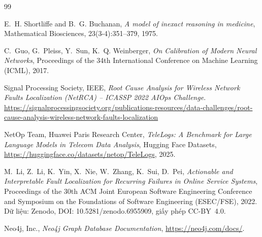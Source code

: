 \documentclass[12pt,a4paper]{report}
\begin{document}
\begin{thebibliography}{99}

E.~H. Shortliffe and B.~G. Buchanan,
\emph{A model of inexact reasoning in medicine},
Mathematical Biosciences, 23(3-4):351--379, 1975.

C.~Guo, G.~Pleiss, Y.~Sun, K.~Q. Weinberger,
\emph{On Calibration of Modern Neural Networks},
Proceedings of the 34th International Conference on Machine Learning (ICML), 2017.

Signal Processing Society, IEEE,
\emph{Root Cause Analysis for Wireless Network Faults Localization (NetRCA) -- ICASSP 2022 AIOps
Challenge}.
\url{https://signalprocessingsociety.org/publications-resources/data-challenges/root-cause-analysis-wireless-network-faults-localization}

NetOp Team, Huawei Paris Research Center,
\emph{TeleLogs: A Benchmark for Large Language Models in Telecom Data Analysis},
Hugging Face Datasets, \url{https://huggingface.co/datasets/netop/TeleLogs}, 2025.

M.~Li, Z.~Li, K.~Yin, X.~Nie, W.~Zhang, K.~Sui, D.~Pei,
\emph{Actionable and Interpretable Fault Localization for Recurring Failures in Online Service
Systems},
Proceedings of the 30th ACM Joint European Software Engineering Conference and Symposium on the
Foundations of Software Engineering (ESEC/FSE), 2022.
Dữ liệu: Zenodo, DOI: 10.5281/zenodo.6955909, giấy phép CC-BY~4.0.

Neo4j, Inc., \emph{Neo4j Graph Database Documentation}, \url{https://neo4j.com/docs/}.

\end{thebibliography}
\end{document}
